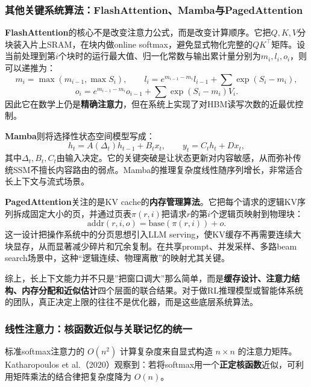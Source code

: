 \documentclass[12pt,a4paper]{article}
\begin{document}
\subsubsection{其他关键系统算法：FlashAttention、Mamba与PagedAttention}

\textbf{FlashAttention}的核心不是改变注意力公式，而是改变计算顺序。它把$Q,K,V$分块装入片上SRAM，在块内做online softmax，避免显式物化完整的$QK^\top$矩阵。设当前处理到第$i$个块时的运行最大值、归一化常数与输出累计量分别为$m_i,l_i,o_i$，则可以递推为：
\begin{equation}
m_i = \max(m_{i-1}, \max S_i),\qquad
l_i = e^{m_{i-1}-m_i} l_{i-1} + \sum \exp(S_i - m_i),
\end{equation}
\begin{equation}
o_i = e^{m_{i-1}-m_i} o_{i-1} + \sum \exp(S_i - m_i)V_i.
\end{equation}
因此它在数学上仍是\textbf{精确注意力}，但在系统上实现了对HBM读写次数的近最优控制。

\textbf{Mamba}则将选择性状态空间模型写成：
\begin{equation}
h_t = A(\Delta_t) h_{t-1} + B_t x_t,\qquad y_t = C_t h_t + D x_t,
\end{equation}
其中$\Delta_t,B_t,C_t$由输入决定。它的关键突破是让状态更新对内容敏感，从而弥补传统SSM不擅长内容路由的弱点。Mamba的推理复杂度线性随序列增长，非常适合长上下文与流式场景。

\textbf{PagedAttention}关注的是KV cache的\textbf{内存管理算法}。它把每个请求的逻辑KV序列拆成固定大小的页，并通过页表$\pi(r,i)$把请求$r$的第$i$个逻辑页映射到物理块：
\begin{equation}
\text{addr}(r,i,o) = \text{base}(\pi(r,i)) + o.
\end{equation}
这一设计把操作系统中的分页思想引入LLM serving，使KV缓存不再需要连续大块显存，从而显著减少碎片和冗余复制。在共享prompt、并发采样、多路beam search场景中，这种“逻辑连续、物理离散”的映射尤其关键。

综上，长上下文能力并不只是”把窗口调大”那么简单，而是\textbf{缓存设计、注意力结构、内存分配和近似估计}四个层面的联合结果。对于做RL推理模型或智能体系统的团队，真正决定上限的往往不是优化器，而是这些底层系统算法。

\subsubsection{线性注意力：核函数近似与关联记忆的统一}
\label{sec:linear-attn}

标准softmax注意力的 $O(n^2)$ 计算复杂度来自显式构造 $n \times n$ 的注意力矩阵。Katharopoulos et al.（2020）观察到：若将softmax用一个\textbf{正定核函数}近似，可利用矩阵乘法的结合律把复杂度降为 $O(n)$。
\end{document}
